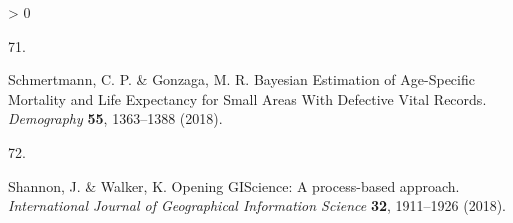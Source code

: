 \documentclass[
]{article}
\newlength{\cslhangindent}
\newlength{\csllabelwidth}
\newenvironment{CSLReferences}[2] %
 {%
  \setlength{\parindent}{0pt}
  \ifodd #1 \everypar{\setlength{\hangindent}{\cslhangindent}}\ignorespaces\fi
  \ifnum #2 > 0
  \setlength{\parskip}{#2\baselineskip}
  \fi
 }%
 {}
\newcommand{\CSLLeftMargin}[1]{\parbox[t]{\csllabelwidth}{#1}}
\newcommand{\CSLRightInline}[1]{\parbox[t]{\linewidth - \csllabelwidth}{#1}\break}
\begin{document}
\begin{CSLReferences}{0}{0}
\leavevmode\hypertarget{ref-Schmertmann2018}{}%
\CSLLeftMargin{71. }
\CSLRightInline{Schmertmann, C. P. \& Gonzaga, M. R. {Bayesian Estimation of Age-Specific Mortality and Life Expectancy for Small Areas With Defective Vital Records}. \emph{Demography} \textbf{55}, 1363--1388 (2018).}

\leavevmode\hypertarget{ref-Shannon2018}{}%
\CSLLeftMargin{72. }
\CSLRightInline{Shannon, J. \& Walker, K. {Opening GIScience: A process-based approach}. \emph{International Journal of Geographical Information Science} \textbf{32}, 1911--1926 (2018).}

\end{CSLReferences}
\end{document}

